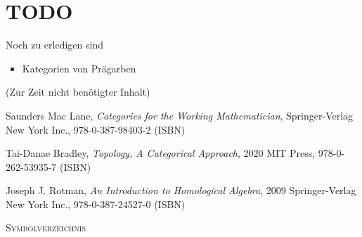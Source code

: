 \documentclass[a4paper]{amsart}
\theoremstyle{definition}
\begin{document}
\section{TODO}
Noch zu erledigen sind
\begin{itemize}
   \item Kategorien von Prägarben
\end{itemize}



\begin{backup}
    (Zur Zeit nicht benötigter Inhalt)
\end{backup}

\begin{thebibliography}{9}

      Saunders Mac Lane, \emph{Categories for the Working Mathematician},
      Springer-Verlag New York Inc., 978-0-387-98403-2 (ISBN)
      
      Tai-Danae Bradley, \emph{Topology, A Categorical Approach},
      2020 MIT Press, 978-0-262-53935-7 (ISBN)

   	Joseph J. Rotman, \emph{An Introduction to Homological Algebra},
   	2009 Springer-Verlag New York Inc., 978-0-387-24527-0 (ISBN)
      
\end{thebibliography}

\begin{large}
    \centerline{\textsc{Symbolverzeichnis}}
\end{large}
\bigskip
\end{document}
